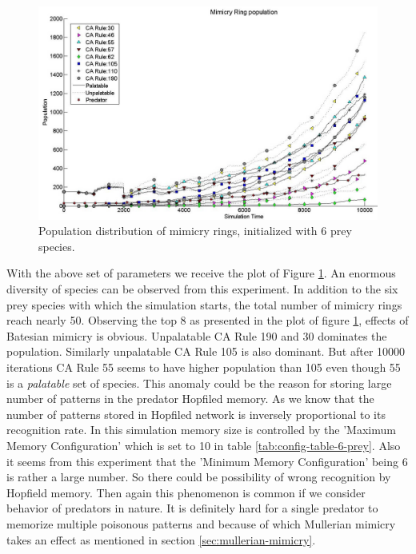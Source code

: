 \begin{figure}[H]
	\centering
	\includegraphics[scale=0.45]{images/simTime10k-6Prey}
	\caption[Population distribution of mimicry rings (6 prey species)]{Population distribution of mimicry rings, initialized with 6 prey species.}
	\label{fig:plot-6-prey}
\end{figure}

With the above set of parameters we receive the plot of Figure \ref{fig:plot-6-prey}. An enormous diversity of species can be observed from this experiment. In addition to the six prey species with which the simulation starts, the total number of mimicry rings reach nearly 50. Observing the top 8 as presented in the plot of figure \ref{fig:plot-6-prey}, effects of Batesian mimicry is obvious. Unpalatable CA Rule 190 and 30 dominates the population. Similarly unpalatable CA Rule 105 is also dominant. But after 10000 iterations CA Rule 55 seems to have higher population than 105 even though 55 is a \textsl{palatable} set of species. This anomaly could be the reason for storing large number of patterns in the predator Hopfiled memory. As we know that the number of patterns stored in Hopfiled network is inversely proportional to its recognition rate. In this simulation memory size is controlled by the 'Maximum Memory Configuration' which is set to 10 in table \ref{tab:config-table-6-prey}. Also it seems from this experiment that the 'Minimum Memory Configuration' being 6 is rather a large number. So there could be possibility of wrong recognition by Hopfield memory. Then again this phenomenon is common if we consider behavior of predators in nature. It is definitely hard for a single predator to memorize multiple poisonous patterns and because of which Mullerian mimicry takes an effect as mentioned in section \ref{sec:mullerian-mimicry}.

